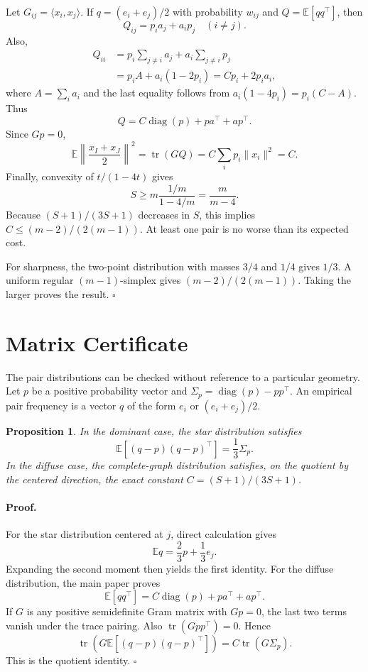 \documentclass[twoside]{article}
\newtheorem{proposition}[theorem]{Proposition}
\newcommand{\E}{\mathbb E}
\begin{document}
Let $G_{ij}=\langle x_i,x_j\rangle$. If
$q=(e_i+e_j)/2$ with probability $w_{ij}$ and $Q=\E[qq^\top]$, then
\[
 Q_{ij}=p_i a_j+a_i p_j\quad(i\ne j).
\]
Also,
\begin{align*}
 Q_{ii}
 &=p_i\sum_{j\ne i}a_j+a_i\sum_{j\ne i}p_j\\
 &=p_iA+a_i(1-2p_i)
 =Cp_i+2p_i a_i,
\end{align*}
where $A=\sum_i a_i$ and the last equality follows from
$a_i(1-4p_i)=p_i(C-A)$. Thus
\[
 Q=C\operatorname{diag}(p)+pa^\top+ap^\top.
\]
Since $Gp=0$,
\[
 \E\left\|\frac{x_I+x_J}{2}\right\|^2
 =\operatorname{tr}(GQ)
 =C\sum_i p_i\|x_i\|^2=C.
\]
Finally, convexity of $t/(1-4t)$ gives
\[
 S\geq m\frac{1/m}{1-4/m}=\frac{m}{m-4}.
\]
Because $(S+1)/(3S+1)$ decreases in $S$, this implies
$C\leq(m-2)/(2(m-1))$. At least one pair is no worse than its expected
cost.

For sharpness, the two-point distribution with masses $3/4$ and $1/4$ gives
$1/3$. A uniform regular $(m-1)$-simplex gives
$(m-2)/(2(m-1))$. Taking the larger proves the result. \hfill$\square$

\section{Matrix Certificate}\label{app:matrix}

The pair distributions can be checked without reference to a particular
geometry. Let $p$ be a positive probability vector and
$\Sigma_p=\operatorname{diag}(p)-pp^\top$. An empirical pair frequency is a
vector $q$ of the form $e_i$ or $(e_i+e_j)/2$.

\begin{proposition}\label{prop:matrix}
In the dominant case, the star distribution satisfies
\[
 \E[(q-p)(q-p)^\top]=\frac13\Sigma_p.
\]
In the diffuse case, the complete-graph distribution satisfies, on the
quotient by the centered direction, the exact constant
$C=(S+1)/(3S+1)$.
\end{proposition}

\paragraph{Proof.}
For the star distribution centered at $j$, direct calculation gives
\[
 \E q=\frac23p+\frac13e_j.
\]
Expanding the second moment then yields the first identity. For the diffuse
distribution, the main paper proves
\[
 \E[qq^\top]
 =C\operatorname{diag}(p)+pa^\top+ap^\top.
\]
If $G$ is any positive semidefinite Gram matrix with $Gp=0$, the last two
terms vanish under the trace pairing. Also
$\operatorname{tr}(Gpp^\top)=0$. Hence
\[
 \operatorname{tr}\left(G\E[(q-p)(q-p)^\top]\right)
 =C\operatorname{tr}(G\Sigma_p).
\]
This is the quotient identity. \hfill$\square$
\end{document}
